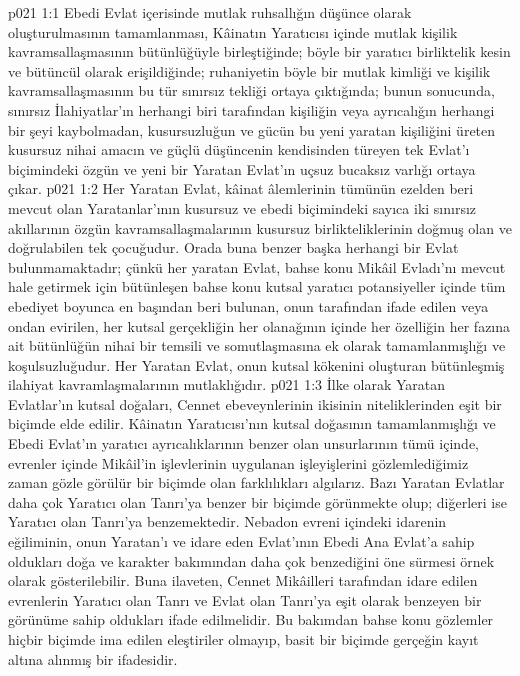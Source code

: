 \vs p021 1:1 Ebedi Evlat içerisinde mutlak ruhsallığın düşünce olarak oluşturulmasının tamamlanması, Kâinatın Yaratıcısı içinde mutlak kişilik kavramsallaşmasının bütünlüğüyle birleştiğinde; böyle bir yaratıcı birliktelik kesin ve bütüncül olarak erişildiğinde; ruhaniyetin böyle bir mutlak kimliği ve kişilik kavramsallaşmasının bu tür sınırsız tekliği ortaya çıktığında; bunun sonucunda, sınırsız İlahiyatlar’ın herhangi biri tarafından kişiliğin veya ayrıcalığın herhangi bir şeyi kaybolmadan, kusursuzluğun ve gücün bu yeni yaratan kişiliğini üreten kusursuz nihai amacın ve güçlü düşüncenin kendisinden türeyen tek Evlat’ı biçimindeki özgün ve yeni bir Yaratan Evlat’ın uçsuz bucaksız varlığı ortaya çıkar.
\vs p021 1:2 Her Yaratan Evlat, kâinat âlemlerinin tümünün ezelden beri mevcut olan Yaratanlar’ının kusursuz ve ebedi biçimindeki sayıca iki sınırsız akıllarının özgün kavramsallaşmalarının kusursuz birlikteliklerinin doğmuş olan ve doğrulabilen tek çocuğudur. Orada buna benzer başka herhangi bir Evlat bulunmamaktadır; çünkü her yaratan Evlat, bahse konu Mikâil Evladı’nı mevcut hale getirmek için bütünleşen bahse konu kutsal yaratıcı potansiyeller içinde tüm ebediyet boyunca en başından beri bulunan, onun tarafından ifade edilen veya ondan evirilen, her kutsal gerçekliğin her olanağının içinde her özelliğin her fazına ait bütünlüğün nihai bir temsili ve somutlaşmasına ek olarak tamamlanmışlığı ve koşulsuzluğudur. Her Yaratan Evlat, onun kutsal kökenini oluşturan bütünleşmiş ilahiyat kavramlaşmalarının mutlaklığıdır.
\vs p021 1:3 İlke olarak Yaratan Evlatlar’ın kutsal doğaları, Cennet ebeveynlerinin ikisinin niteliklerinden eşit bir biçimde elde edilir. Kâinatın Yaratıcısı’nın kutsal doğasının tamamlanmışlığı ve Ebedi Evlat’ın yaratıcı ayrıcalıklarının benzer olan unsurlarının tümü içinde, evrenler içinde Mikâil’in işlevlerinin uygulanan işleyişlerini gözlemlediğimiz zaman gözle görülür bir biçimde olan farklılıkları algılarız. Bazı Yaratan Evlatlar daha çok Yaratıcı olan Tanrı’ya benzer bir biçimde görünmekte olup; diğerleri ise Yaratıcı olan Tanrı’ya benzemektedir. Nebadon evreni içindeki idarenin eğiliminin, onun Yaratan’ı ve idare eden Evlat’ının Ebedi Ana Evlat’a sahip oldukları doğa ve karakter bakımından daha çok benzediğini öne sürmesi örnek olarak gösterilebilir. Buna ilaveten, Cennet Mikâilleri tarafından idare edilen evrenlerin Yaratıcı olan Tanrı ve Evlat olan Tanrı’ya eşit olarak benzeyen bir görünüme sahip oldukları ifade edilmelidir. Bu bakımdan bahse konu gözlemler hiçbir biçimde ima edilen eleştiriler olmayıp, basit bir biçimde gerçeğin kayıt altına alınmış bir ifadesidir.
